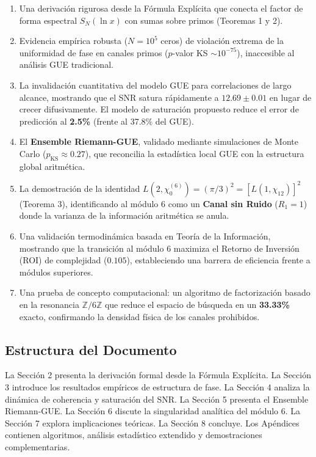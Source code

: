 \documentclass[12pt, a4paper]{article}
\theoremstyle{plain}
\theoremstyle{definition}
\newcommand{\Z}{\mathbb{Z}}
\begin{document}
\begin{enumerate}
\item Una derivación rigurosa desde la Fórmula Explícita que conecta el factor de forma espectral $S_N(\ln x)$ con sumas sobre primos (Teoremas 1 y 2).

\item Evidencia empírica robusta ($N=10^5$ ceros) de violación extrema de la uniformidad de fase en canales primos ($p$-valor KS $\sim 10^{-75}$), inaccesible al análisis GUE tradicional.

\item La invalidación cuantitativa del modelo GUE para correlaciones de largo alcance, mostrando que el SNR satura rápidamente a $12.69 \pm 0.01$ en lugar de crecer difusivamente. El modelo de saturación propuesto reduce el error de predicción al \textbf{2.5\%} (frente al 37.8\% del GUE).

\item El \textbf{Ensemble Riemann-GUE}, validado mediante simulaciones de Monte Carlo ($p_{\text{KS}} \approx 0.27$), que reconcilia la estadística local GUE con la estructura global aritmética.

\item La demostración de la identidad $L(2,\chi_0^{(6)}) = (\pi/3)^2 = [L(1,\chi_{12})]^2$ (Teorema 3), identificando al módulo 6 como un \textbf{Canal sin Ruido} ($R_1=1$) donde la varianza de la información aritmética se anula.

\item Una validación termodinámica basada en Teoría de la Información, mostrando que la transición al módulo 6 maximiza el Retorno de Inversión (ROI) de complejidad ($0.105$), estableciendo una barrera de eficiencia frente a módulos superiores.

\item Una prueba de concepto computacional: un algoritmo de factorización basado en la resonancia $\Z/6\Z$ que reduce el espacio de búsqueda en un \textbf{33.33\%} exacto, confirmando la densidad física de los canales prohibidos.
\end{enumerate}

\subsection{Estructura del Documento}

La Sección 2 presenta la derivación formal desde la Fórmula Explícita. La Sección 3 introduce los resultados empíricos de estructura de fase. La Sección 4 analiza la dinámica de coherencia y saturación del SNR. La Sección 5 presenta el Ensemble Riemann-GUE. La Sección 6 discute la singularidad analítica del módulo 6. La Sección 7 explora implicaciones teóricas. La Sección 8 concluye. Los Apéndices contienen algoritmos, análisis estadístico extendido y demostraciones complementarias.
\end{document}
